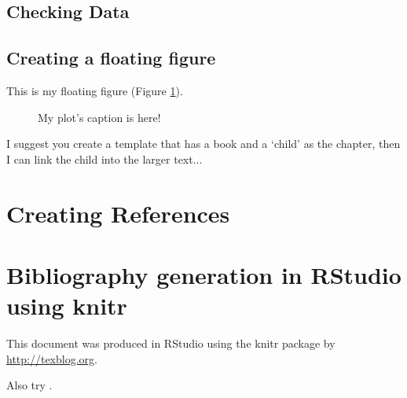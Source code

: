 \subsection{Checking Data}

\subsection{Creating a floating figure}

This is my floating figure (Figure \ref{fig:plot}).

\begin{figure}
\label{fig:plot}
\caption{My plot's caption is here!}
\end{figure}

I suggest you create a template that has a book and a `child' as the chapter, then I can link the child into the larger text...


\section{Creating References}

\section{Bibliography generation in RStudio using knitr}

This document was produced in RStudio using the knitr package \citep{knitr2013} by \url{http://texblog.org}. 

Also try \citet{fenner2018}.
 
